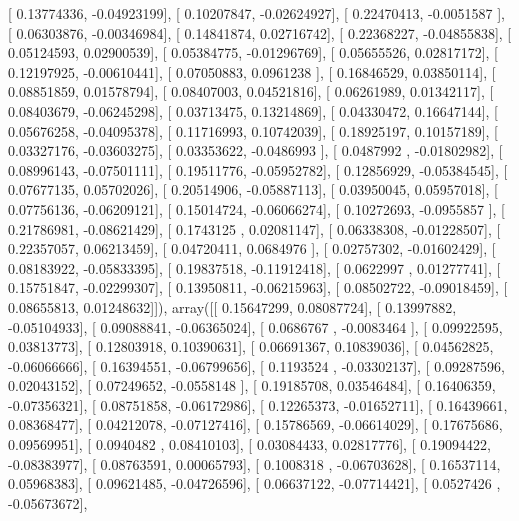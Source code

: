 \documentclass{article}
\begin{document}
       [ 0.13774336, -0.04923199],
       [ 0.10207847, -0.02624927],
       [ 0.22470413, -0.0051587 ],
       [ 0.06303876, -0.00346984],
       [ 0.14841874,  0.02716742],
       [ 0.22368227, -0.04855838],
       [ 0.05124593,  0.02900539],
       [ 0.05384775, -0.01296769],
       [ 0.05655526,  0.02817172],
       [ 0.12197925, -0.00610441],
       [ 0.07050883,  0.0961238 ],
       [ 0.16846529,  0.03850114],
       [ 0.08851859,  0.01578794],
       [ 0.08407003,  0.04521816],
       [ 0.06261989,  0.01342117],
       [ 0.08403679, -0.06245298],
       [ 0.03713475,  0.13214869],
       [ 0.04330472,  0.16647144],
       [ 0.05676258, -0.04095378],
       [ 0.11716993,  0.10742039],
       [ 0.18925197,  0.10157189],
       [ 0.03327176, -0.03603275],
       [ 0.03353622, -0.0486993 ],
       [ 0.0487992 , -0.01802982],
       [ 0.08996143, -0.07501111],
       [ 0.19511776, -0.05952782],
       [ 0.12856929, -0.05384545],
       [ 0.07677135,  0.05702026],
       [ 0.20514906, -0.05887113],
       [ 0.03950045,  0.05957018],
       [ 0.07756136, -0.06209121],
       [ 0.15014724, -0.06066274],
       [ 0.10272693, -0.0955857 ],
       [ 0.21786981, -0.08621429],
       [ 0.1743125 ,  0.02081147],
       [ 0.06338308, -0.01228507],
       [ 0.22357057,  0.06213459],
       [ 0.04720411,  0.0684976 ],
       [ 0.02757302, -0.01602429],
       [ 0.08183922, -0.05833395],
       [ 0.19837518, -0.11912418],
       [ 0.0622997 ,  0.01277741],
       [ 0.15751847, -0.02299307],
       [ 0.13950811, -0.06215963],
       [ 0.08502722, -0.09018459],
       [ 0.08655813,  0.01248632]]), array([[ 0.15647299,  0.08087724],
       [ 0.13997882, -0.05104933],
       [ 0.09088841, -0.06365024],
       [ 0.0686767 , -0.0083464 ],
       [ 0.09922595,  0.03813773],
       [ 0.12803918,  0.10390631],
       [ 0.06691367,  0.10839036],
       [ 0.04562825, -0.06066666],
       [ 0.16394551, -0.06799656],
       [ 0.1193524 , -0.03302137],
       [ 0.09287596,  0.02043152],
       [ 0.07249652, -0.0558148 ],
       [ 0.19185708,  0.03546484],
       [ 0.16406359, -0.07356321],
       [ 0.08751858, -0.06172986],
       [ 0.12265373, -0.01652711],
       [ 0.16439661,  0.08368477],
       [ 0.04212078, -0.07127416],
       [ 0.15786569, -0.06614029],
       [ 0.17675686,  0.09569951],
       [ 0.0940482 ,  0.08410103],
       [ 0.03084433,  0.02817776],
       [ 0.19094422, -0.08383977],
       [ 0.08763591,  0.00065793],
       [ 0.1008318 , -0.06703628],
       [ 0.16537114,  0.05968383],
       [ 0.09621485, -0.04726596],
       [ 0.06637122, -0.07714421],
       [ 0.0527426 , -0.05673672],
\end{document}
